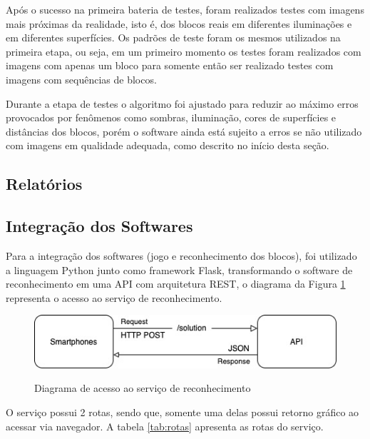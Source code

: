     Após o sucesso na primeira bateria de testes, foram realizados testes com imagens mais próximas da realidade, isto é, dos blocos reais em diferentes iluminações e em diferentes superfícies. Os padrões de teste foram os mesmos utilizados na primeira etapa, ou seja, em um primeiro momento os testes foram realizados com imagens com apenas um bloco para somente então ser realizado testes com imagens com sequências de blocos.
    
    Durante a etapa de testes o algoritmo foi ajustado para reduzir ao máximo erros provocados por fenômenos como sombras, iluminação, cores de superfícies e distâncias dos blocos, porém o software ainda está sujeito a erros se não utilizado com imagens em qualidade adequada, como descrito no início desta seção.    


    \subsection{Relatórios}
    
    
    \subsection {Integração dos Softwares}
    
    Para a integração dos softwares (jogo e reconhecimento dos blocos), foi utilizado a linguagem Python junto como framework Flask, transformando o software de reconhecimento em uma API com arquitetura REST, o diagrama da Figura \ref{figura:diagrama_acesso_integracao} representa o acesso ao serviço de reconhecimento.
    
    \begin{figure}[H]
        \caption{Diagrama de acesso ao serviço de reconhecimento}
        \centering
        \includegraphics[width=15cm]{Imagens/Cap4/diagrama_acesso_integracao.jpg}
        \label{figura:diagrama_acesso_integracao}
    \end{figure}
    
    O serviço possui 2 rotas, sendo que, somente uma delas possui retorno gráfico ao acessar via navegador. A tabela \ref{tab:rotas} apresenta as rotas do serviço.
    
